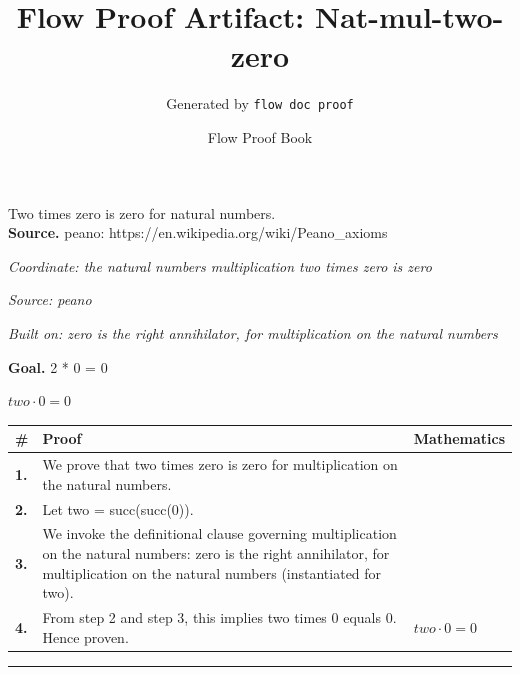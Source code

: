 \documentclass[11pt]{article}
\title{Flow Proof Artifact: Nat-mul-two-zero}
\author{Generated by \texttt{flow doc proof}}
\date{Flow Proof Book}
\theoremstyle{definition}
\begin{document}
\maketitle
Two times zero is zero for natural numbers.\\[0.5em]
\textbf{Source.} peano: https://en.wikipedia.org/wiki/Peano\_axioms\\[0.5em]
\bigskip
{}\par
\smallskip\noindent\textit{Coordinate: the natural numbers \cdot multiplication \cdot two times zero is zero}\par
\smallskip\noindent\textit{Source: peano}\par
\smallskip\noindent\textit{Built on: zero is the right annihilator, for multiplication on the natural numbers}\par
\medskip
\noindent\textbf{Goal.} 2 * 0 = 0\par
\noindent$\displaystyle two \cdot 0 = 0$\par
\medskip
\noindent
\begin{tabular}{@{} >{\raggedright\arraybackslash}p{} >{\raggedright\arraybackslash}p{} >{\raggedleft\arraybackslash}p{} @{}}
\textbf{\#} & \textbf{Proof} & \textbf{Mathematics} \\
\midrule
\textbf{1.} & We prove that two times zero is zero for multiplication on the natural numbers. & \\[0.45em]
\textbf{2.} & Let two = succ(succ(0)). & \\[0.45em]
\textbf{3.} & We invoke the definitional clause governing multiplication on the natural numbers: zero is the right annihilator, for multiplication on the natural numbers (instantiated for two). & \\[0.45em]
\textbf{4.} & From step 2 and step 3, this implies two times 0 equals 0. Hence proven. & $\displaystyle two \cdot 0 = 0$ \\[0.45em]
\bottomrule
\end{tabular}
\label{thm:Nat-multiplication-two_times_zero_is_zero}
\par\medskip\hrule
\end{document}
